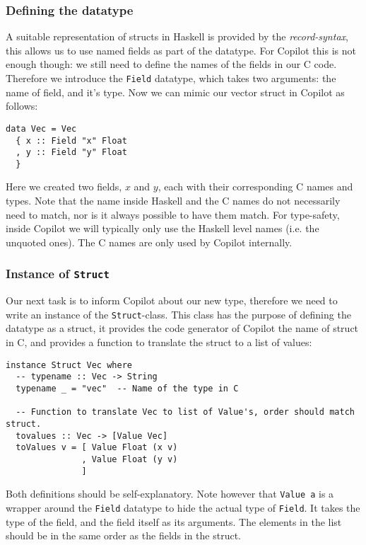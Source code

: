 \subsubsection*{Defining the datatype}
A suitable representation of structs in Haskell is provided by the
\emph{record-syntax}, this allows us to use named fields as part of the
datatype. For Copilot this is not enough though: we still need to define the
names of the fields in our C code. Therefore we introduce the  \texttt{Field}
datatype, which takes two arguments: the name of field, and it's type. Now we
can mimic our vector struct in Copilot as follows:
\begin{lstlisting}[language=Copilot]
data Vec = Vec
  { x :: Field "x" Float
  , y :: Field "y" Float
  }
\end{lstlisting}
Here we created two fields, $x$ and $y$, each with their corresponding C names
and types. Note that the name inside Haskell and the C names do not necessarily
need to match, nor is it always possible to have them match. For type-safety,
inside Copilot we will typically only use the Haskell level names (i.e. the
unquoted ones). The C names are only used by Copilot internally.


\subsubsection*{Instance of \texttt{Struct}}
Our next task is to inform Copilot about our new type, therefore we need to
write an instance of the \texttt{Struct}-class. This class has the purpose of
defining the datatype as a struct, it provides the code generator of Copilot the
name of struct in C, and provides a function to translate the struct to a list
of values:
\begin{lstlisting}[language=Copilot]
instance Struct Vec where
  -- typename :: Vec -> String
  typename _ = "vec"  -- Name of the type in C

  -- Function to translate Vec to list of Value's, order should match struct.
  tovalues :: Vec -> [Value Vec]
  toValues v = [ Value Float (x v)
               , Value Float (y v)
               ]
\end{lstlisting}
Both definitions should be self-explanatory. Note however that
\texttt{Value a} is a wrapper around the \texttt{Field} datatype to hide the
actual type of \texttt{Field}. It takes the type of the field, and the field
itself as its arguments. The elements in the list should be in the same order
as the fields in the struct.

